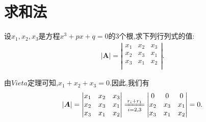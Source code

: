 \documentclass[../../main.tex]{subfiles}
\begin{document}
\section{求和法}

\begin{example}
设$x_1,x_2,x_3$是方程$x^3+px+q=0$的3个根,求下列行列式的值:
\begin{gather}
\left| \boldsymbol{A} \right|=\left| \begin{matrix}
x_1&		x_2&		x_3\\
x_2&		x_3&		x_1\\
x_3&		x_1&		x_2\\
\end{matrix} \right|.
\nonumber
\end{gather}
\end{example}
\begin{solution}
由$Vieta$定理可知,$x_1+x_2+x_3=0$.因此,我们有
\begin{equation}
\begin{split}
\left| \boldsymbol{A} \right|=\left| \begin{matrix}
x_1&		x_2&		x_3\\
x_2&		x_3&		x_1\\
x_3&		x_1&		x_2\\
\end{matrix} \right|\xlongequal[i=2,3]{r_i+r_1}\left| \begin{matrix}
0&		0&		0\\
x_2&		x_3&		x_1\\
x_3&		x_1&		x_2\\
\end{matrix} \right|=0.
\end{split}
\nonumber
\end{equation}
\end{solution}
\end{document}
